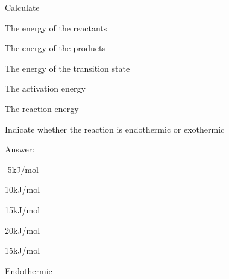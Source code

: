 \documentclass[main.tex]{subfiles}
\newcommand\chapterlabel{kinetics}
\begin{document}
\begin{description}
\begin{example}
\begin{center}
\begin{endiagram}[x-label-text=\footnotesize reaction coordinate, y-label-text={\footnotesize Enthalpy, kJ/mol}]
 \end{endiagram}\end{center}
Calculate
\begin{inparaenum}[(a)]	
\item The energy of the reactants
\item	 The energy of the products
\item	 The energy of the transition state
\item	 The activation energy
\item	 The reaction energy  
\item	 Indicate whether the reaction is endothermic or exothermic
\end{inparaenum} 
\flushright Answer:   
\begin{inparaenum}[(a)]	
\item  -5kJ/mol
\item	  10kJ/mol
\item	  15kJ/mol
\item	  20kJ/mol
\item	  15kJ/mol
\item	   Endothermic
\end{inparaenum}
\end{example}%

\begin{minipage}[t]{1.5\linewidth}

     \label{Fig:{\chapterlabel}\thefigurenewcounter}
 \begin{center}  \hspace{-5cm}
 \begin{endiagram}[x-label-text=\footnotesize reaction coordinate, y-label-text={\footnotesize Enthalpy, kJ/mol}]
  \ShowGain[label]
  \end{endiagram}
  \begin{endiagram}[x-label-text=\footnotesize reaction coordinate, y-label-text={\footnotesize Enthalpy, kJ/mol}]
  \ShowGain[label]
  \end{endiagram}
   \begin{endiagram}[x-label-text=\footnotesize reaction coordinate, y-label-text={\footnotesize Enthalpy, kJ/mol}]
 \ShowEa[label,connect={draw=none}]
  \end{endiagram}  \end{center}
 \end{minipage}



\end{description}
\end{document}
